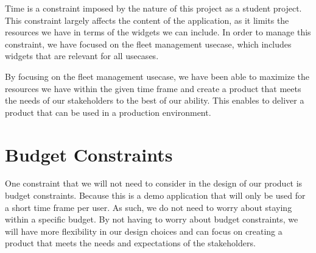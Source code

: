 Time is a constraint imposed by the nature of this project as a student project. This constraint largely affects the content of the application, as it limits the resources we have in terms of the \glspl{widget} we can include. In order to manage this constraint, we have focused on the fleet management \gls{usecase}, which includes \glspl{widget} that are relevant for all \glspl{usecase}.

By focusing on the fleet management \gls{usecase}, we have been able to maximize the resources we have within the given time frame and create a product that meets the needs of our \glspl{stakeholder} to the best of our ability. This enables to deliver a product that can be used in a production environment.



\section{Budget Constraints}

One constraint that we will not need to consider in the design of our product is budget constraints. Because this is a demo application that will only be used for a short time frame per user. As such, we do not need to worry about staying within a specific budget. By not having to worry about budget constraints, we will have more flexibility in our design choices and can focus on creating a product that meets the needs and expectations of the \glspl{stakeholder}.